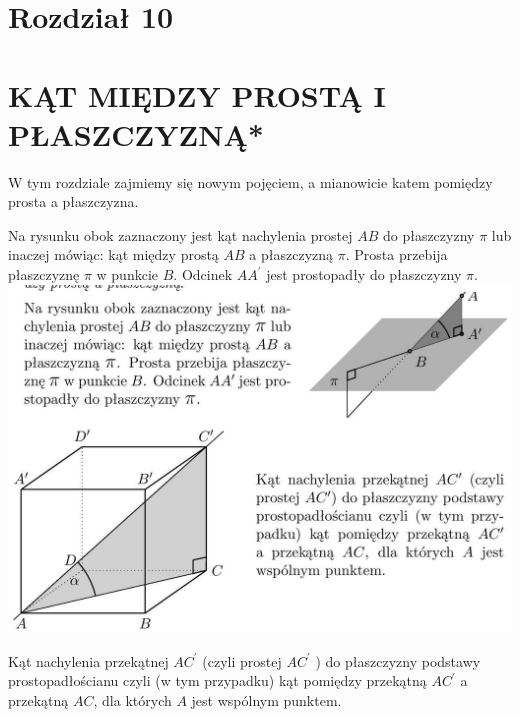 \documentclass[10pt]{article}
\begin{document}
\section*{Rozdział 10}
\section*{KĄT MIĘDZY PROSTĄ I PŁASZCZYZNĄ*}
W tym rozdziale zajmiemy się nowym pojęciem, a mianowicie katem pomiędzy prosta a płaszczyzna.

Na rysunku obok zaznaczony jest kąt nachylenia prostej \(A B\) do płaszczyzny \(\pi\) lub inaczej mówiąc: kąt między prostą \(A B\) a płaszczyzną \(\pi\). Prosta przebija płaszczyznę \(\pi\) w punkcie \(B\). Odcinek \(A A^{\prime}\) jest prostopadły do płaszczyzny \(\pi\).\\
\includegraphics[max width=\textwidth, center]{2024_11_21_e9b4faa005d5be2cc318g-090}

Kąt nachylenia przekątnej \(A C^{\prime}\) (czyli prostej \(A C^{\prime}\) ) do płaszczyzny podstawy prostopadłościanu czyli (w tym przypadku) kąt pomiędzy przekątną \(A C^{\prime}\) a przekątną \(A C\), dla których \(A\) jest wspólnym punktem.
\end{document}
